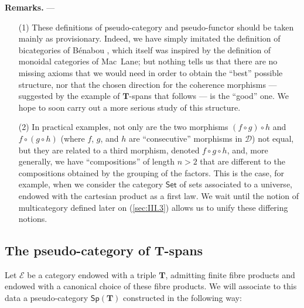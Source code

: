 \documentclass[fleqn]{article}
\newenvironment{rmenv}[1]
  {\phantomsection\par\medskip\noindent\textbf{#1.}\rmfamily}
  {\par\medskip}
\newcommand{\oldpage}[1]{\marginpar{\footnotesize$\Big\vert$ \textit{p.~#1}}}
\newcommand{\TT}{\mathbf{T}}
\newcommand{\cat}[1]{\mathcal{#1}}
\newcommand{\Cat}[1]{\mathsf{#1}}
\newcommand{\Sp}[1]{\Cat{Sp}(#1)}
\begin{document}
\begin{rmenv}{Remarks}
  ---
  \begin{enumerate}
    \item[(1)]
      These definitions of pseudo-category and pseudo-functor should be taken mainly as provisionary.
      Indeed, we have simply imitated the definition of bicategories of Bénabou \cite{Be}, which itself was inspired by the definition of monoidal categories of Mac~Lane;
      but nothing tells us that there are no missing axioms that we would need in order to obtain the ``best'' possible structure, nor that the chosen direction for the coherence morphisms --- suggested by the example of $\TT$-spans that follows --- is the ``good'' one.
      We hope to soon carry out a more serious study of this structure.

    \item[(2)]
      In practical examples, not only are the two morphisms $(f\circ g)\circ h$ and $f\circ(g\circ h)$ (where $f$, $g$, and $h$ are ``consecutive'' morphisms in $\cat{D}$) not equal, but they are related to a third morphism, denoted $f\circ g\circ h$, and, more generally, we have ``compositions'' of length $n>2$ that are different to the compositions obtained by the grouping of the factors.
      \oldpage{248}
      This is the case, for example, when we consider the category $\Cat{Set}$ of sets associated to a universe, endowed with the cartesian product as a first law.
      We wait until the notion of multicategory defined later on (\cref{sec:III.3}) allows us to unify these differing notions.
  \end{enumerate}
\end{rmenv}



\subsection{The pseudo-category of $\TT$-spans}
\label{sec:II.2}

Let $\cat{E}$ be a category endowed with a triple $\TT$, admitting finite fibre products and endowed with a canonical choice of these fibre products.
We will associate to this data a pseudo-category $\Sp{\TT}$ constructed in the following way:
\end{document}
